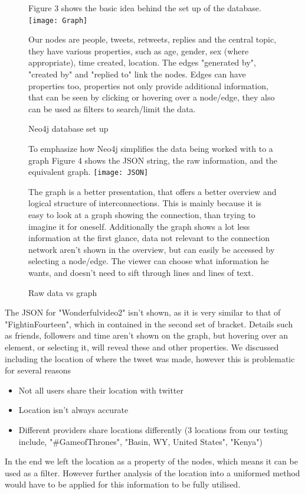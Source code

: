 \documentclass[11pt]{article}
\begin{document}
\begin{figure}
Figure 3 shows the basic idea behind the set up of the database.\newline
\texttt{[image: Graph]}\newline
\caption{Neo4j database set up} 
\label{fig: 3}
Our nodes are people, tweets, retweets, replies and the central topic, they have various properties, such as age, gender, sex (where appropriate), time created, location.
The edges "generated by", "created by" and "replied to" link the nodes. Edges can have properties too, properties not only provide additional information, that can be seen by clicking or hovering over a node/edge, they also can be used as filters to search/limit the data.
\end{figure}

\begin{figure}
To emphasize how Neo4j simplifies the data being worked with to a graph Figure 4 shows the JSON string, the raw information, and the equivalent graph.\newline
\texttt{[image: JSON]}\newline
\caption{Raw data vs graph} 
\label{fig: 4}
The graph is a better presentation, that offers a better overview and logical structure of interconnections. This is mainly because it is easy to look at a graph showing the connection, than trying to imagine it for oneself.\newline
Additionally the graph shows a lot less information at the first glance, data not relevant to the connection network aren't shown in the overview, but can easily be accessed by selecting a node/edge. The viewer can choose what information he wants, and doesn't need to sift through lines and lines of text.

\end{figure}
The JSON for "Wonderfulvideo2" isn't shown, as it is very similar to that of "FightinFourteen", which in contained in the second set of bracket{}.
Details such as friends, followers and time aren't shown on the graph, but hovering over an element, or selecting it, will reveal these and other properties.
\newline
We discussed including the location of where the tweet was made, however this is problematic for several reasons
\begin{itemize}
\item Not all users share their location with twitter
\item Location isn't always accurate
\item Different providers share locations differently (3 locations from our testing include, "\#GameofThrones", "Basin, WY, United States", "Kenya")
\end{itemize}
In the end we left the location as a property of the nodes, which means it can be used as a filter. However further analysis of the location into a uniformed method would have to be applied for this information to be fully utilised.\newline
\end{document}
